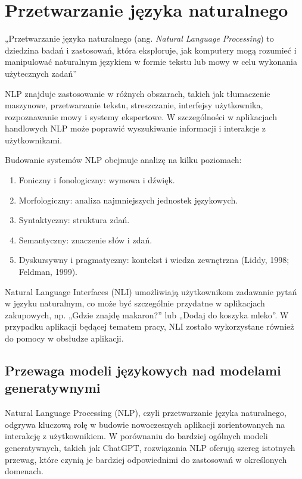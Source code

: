 \section{Przetwarzanie języka naturalnego}

„Przetwarzanie języka naturalnego (ang. \textit{Natural Language Processing}) to dziedzina badań i zastosowań, która eksploruje, jak komputery mogą rozumieć i manipulować naturalnym językiem w formie tekstu lub mowy w celu wykonania użytecznych zadań” \\ \cite{Chowdhary2020} 


NLP znajduje zastosowanie w różnych obszarach, takich jak tłumaczenie maszynowe, przetwarzanie tekstu, streszczanie, interfejsy użytkownika, rozpoznawanie mowy i systemy ekspertowe. W szczególności w aplikacjach handlowych NLP może poprawić wyszukiwanie informacji i interakcje z użytkownikami.

Budowanie systemów NLP obejmuje analizę na kilku poziomach:
\begin{enumerate}
    \item Foniczny i fonologiczny: wymowa i dźwięk.
    \item Morfologiczny: analiza najmniejszych jednostek językowych.
    \item Syntaktyczny: struktura zdań.
    \item Semantyczny: znaczenie słów i zdań.
    \item Dyskursywny i pragmatyczny: kontekst i wiedza zewnętrzna (Liddy, 1998; Feldman, 1999). \cite{Chowdhary2020}
\end{enumerate}

Natural Language Interfaces (NLI) umożliwiają użytkownikom zadawanie pytań w języku naturalnym, co może być szczególnie przydatne w aplikacjach zakupowych, np. „Gdzie znajdę makaron?” lub „Dodaj do koszyka mleko”. W przypadku aplikacji będącej tematem pracy, NLI zostało wykorzystane również do pomocy w obsłudze aplikacji.

\subsection{Przewaga modeli językowych nad modelami generatywnymi}
Natural Language Processing (NLP), czyli przetwarzanie języka naturalnego, odgrywa kluczową rolę w budowie nowoczesnych aplikacji zorientowanych na interakcję z użytkownikiem. W porównaniu do bardziej ogólnych modeli generatywnych, takich jak ChatGPT, rozwiązania NLP oferują szereg istotnych przewag, które czynią je bardziej odpowiednimi do zastosowań w określonych domenach.

